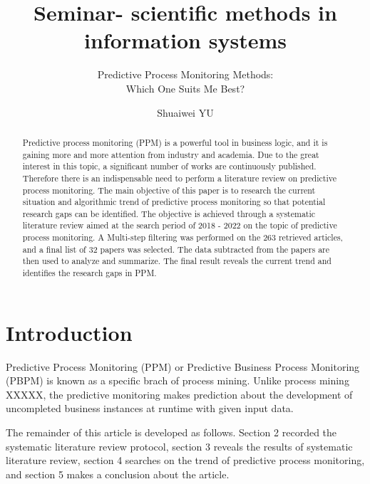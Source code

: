 \documentclass[runningheads]{llncs}
\begin{document}
	\title{Seminar- scientific methods in information systems}
	\subtitle{Predictive Process Monitoring Methods:\\ Which One Suits Me Best?}
	\author{Shuaiwei YU  }
	\maketitle
	
	\begin{abstract}
		Predictive process monitoring (PPM) is a powerful tool in business logic, and it is gaining more and more attention from industry and academia. Due to the great interest in this topic, a significant number of works are continuously published. Therefore there is an indispensable need to perform a literature review on predictive process monitoring. The main objective of this paper is to research the current situation and algorithmic trend of predictive process monitoring so that potential research gaps can be identified. The objective is achieved through a systematic literature review aimed at the search period of 2018 - 2022 on the topic of predictive process monitoring. A Multi-step filtering was performed on the 263 retrieved articles, and a final list of 32 papers was selected. The data subtracted from the papers are then used to analyze and summarize. The final result reveals the current trend and identifies the research gaps in PPM.

	\end{abstract}
	
	\section{Introduction}
	Predictive Process Monitoring (PPM) or Predictive Business Process Monitoring (PBPM) is known as a specific brach of process mining. Unlike process mining XXXXX\cite{}, the predictive monitoring makes prediction about the development of uncompleted business instances at runtime with given input data\cite{original}.
	
	
	
	
	The remainder of this article is developed as follows. Section 2 recorded the systematic literature review protocol, section 3 reveals the results of systematic literature review, section 4 searches on the trend of predictive process monitoring, and section 5 makes a conclusion about the article. 
	
\end{document}
